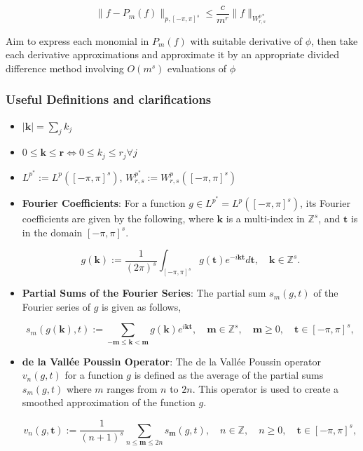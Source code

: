 \documentclass[11pt,a4paper]{article}
\theoremstyle{plain}
\theoremstyle{definition}
\theoremstyle{remark}
\numberwithin{equation}{section}
\begin{document}
\[
\|f - P_{m}(f)\|_{p,[-\pi,\pi]^s} \leq \frac{c}{m^r} \|f\|_{W^{p*}_{r,s}}  
\]

Aim to express each monomial in \(P_{m}(f)\) with suitable derivative of \(\phi \), then take each derivative approximations and approximate it by an appropriate divided difference method involving \(O(m^s)\) evaluations of \(\phi \) 

\subsubsection{Useful Definitions and clarifications}


\begin{itemize}
    \item \(\left\vert \mathbf{k}  \right\vert = \sum_{j} k_{j}\)
    \item  \(0 \leq \mathbf{k} \leq \mathbf{r}  \iff 0 \leq k_{j}\leq r_{j} \forall j\) 
    \item \(L^{p^{\ast} } := L^{p}([-\pi ,\pi ]^s) \), \(W^{p^{\ast} }_{r,s} := W^{p}_{r,s} ([-\pi ,\pi ]^s)\) 

    \item \textbf{Fourier Coefficients}: For a function \( g \in L^{p^*} = L^{p}([-\pi ,\pi ]^s) \), its Fourier coefficients are given by the following, where \( \mathbf{k} \) is a multi-index in \( \mathbb{Z}^s \), and \( \mathbf{t}  \) is in the domain \( [-\pi, \pi]^s \).

    \begin{equation}
        {g}(\mathbf{k}) := \frac{1}{(2\pi)^s} \int_{[-\pi,\pi]^s} g(\mathbf{t})e^{-i \mathbf{kt}} d \mathbf{t}, \quad \mathbf{k} \in \mathbb{Z}^s.  
    \end{equation}


    \item \textbf{Partial Sums of the Fourier Series}: The partial sum \( s_m(g, t) \) of the Fourier series of \( g \) is given as follows,
    
    \begin{equation}
        s_m(g(\mathbf{k}),t) := \sum_{-\mathbf{m} \leq \mathbf{k} < \mathbf{m}}  {g}(\mathbf{k})e^{i \mathbf{kt}}, \quad \mathbf{m}  \in \mathbb{Z}^s, \quad \mathbf{m}  \geq 0, \quad \mathbf{t} \in [-\pi, \pi]^s,
    \end{equation}

    \item \textbf{de la Vallée Poussin Operator}: The de la Vallée Poussin operator \( v_n(g, t) \) for a function \( g \) is defined as the average of the partial sums \( s_m(g, t) \) where \( m \) ranges from \( n \) to \( 2n \). This operator is used to create a smoothed approximation of the function \( g \).
    
    \begin{equation}
        v_n(g,\mathbf{t} ) := \frac{1}{(n+1)^s} \sum_{n \leq \mathbf{m} \leq 2n} s_{\mathbf{m}}(g,t), \quad n \in \mathbb{Z}, \quad n \geq 0, \quad \mathbf{t} \in [-\pi, \pi]^s,
    \end{equation}

\end{itemize}
\end{document}
